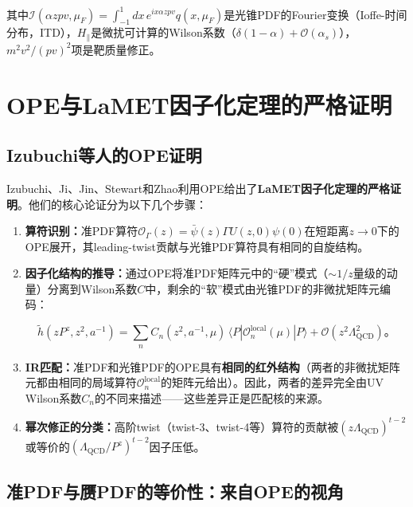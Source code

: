 \documentclass[12pt,a4paper]{ctexart}
\theoremstyle{definition}
\begin{document}
其中$\mathcal{I}(\alpha z pv, \mu_F) = \int_{-1}^1 dx\, e^{ix\alpha zpv} q(x, \mu_F)$是光锥PDF的Fourier变换（Ioffe-时间分布，ITD），$H_\parallel$是微扰可计算的Wilson系数（$\delta(1-\alpha) + \mathcal{O}(\alpha_s)$），$m^2 v^2/(pv)^2$项是靶质量修正。

\section{OPE与LaMET因子化定理的严格证明}

\subsection{Izubuchi等人的OPE证明}

Izubuchi、Ji、Jin、Stewart和Zhao\cite{Izubuchi2018}利用OPE给出了\textbf{LaMET因子化定理的严格证明}。他们的核心论证分为以下几个步骤：

\begin{enumerate}
    \item \textbf{算符识别：}准PDF算符$\mathcal{O}_\Gamma(z) = \bar{\psi}(z)\Gamma U(z,0)\psi(0)$在短距离$z \to 0$下的OPE展开，其leading-twist贡献与光锥PDF算符具有相同的自旋结构。

    \item \textbf{因子化结构的推导：}通过OPE将准PDF矩阵元中的``硬''模式（$\sim 1/z$量级的动量）分离到Wilson系数$C$中，剩余的``软''模式由光锥PDF的非微扰矩阵元编码：

    \begin{equation}
    \tilde{h}(zP^z, z^2, a^{-1}) = \sum_n C_n(z^2, a^{-1}, \mu) \, \langle P|\mathcal{O}_n^{\text{local}}(\mu)|P\rangle + \mathcal{O}(z^2\Lambda_{\text{QCD}}^2)。
    \label{eq:OPE_factorization}
    \end{equation}

    \item \textbf{IR匹配：}准PDF和光锥PDF的OPE具有\textbf{相同的红外结构}（两者的非微扰矩阵元都由相同的局域算符$\mathcal{O}_n^{\text{local}}$的矩阵元给出）。因此，两者的差异完全由UV Wilson系数$C_n$的不同来描述——这些差异正是匹配核的来源。

    \item \textbf{幂次修正的分类：}高阶twist（twist-3、twist-4等）算符的贡献被$(z\Lambda_{\text{QCD}})^{t-2}$或等价的$(\Lambda_{\text{QCD}}/P^z)^{t-2}$因子压低。
\end{enumerate}

\subsection{准PDF与赝PDF的等价性：来自OPE的视角}
\end{document}
